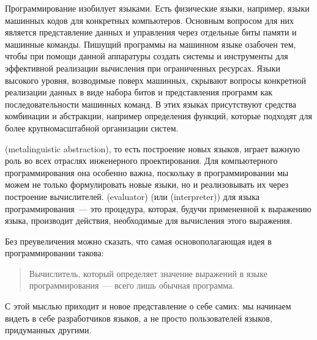 Программирование изобилует языками. Есть физические
языки, например, языки машинных кодов для конкретных компьютеров.
Основным вопросом для них является представление данных и управления
через отдельные биты памяти и машинные команды.  Пишущий программы на
машинном языке озабочен тем, чтобы при помощи данной аппаратуры
создать системы и инструменты для эффективной реализации вычисления
при ограниченных ресурсах. Языки высокого уровня, возводимые поверх
машинных, скрывают вопросы конкретной реализации данных в виде набора
битов и представления программ как последовательности машинных
команд.  В этих языках присутствуют средства комбинации и
абстракции, например определения функций, которые подходят для более
крупномасштабной организации систем.

 (metalinguistic abstraction), 
то есть построение новых языков, играет важную роль во всех отраслях
инженерного проектирования.
Для компьютерного программирования она
особенно важна, поскольку в программировании мы можем не только
формулировать новые языки, но и реализовывать их через построение
вычислителей.  (evaluator) (или 
 (interpreter)) для языка
программирования~--- это процедура, которая, будучи примененной к
выражению языка, производит действия, необходимые для вычисления этого
выражения.

Без преувеличения можно сказать, что самая основополагающая
идея в программировании такова:

\begin{quote}
Вычислитель, который определяет значение выражений в
языке программирования~--- всего лишь обычная программа.
\end{quote}
С этой мыслью приходит и новое представление о себе самих:
мы начинаем видеть в себе разработчиков языков, а не
просто пользователей языков, придуманных другими.

